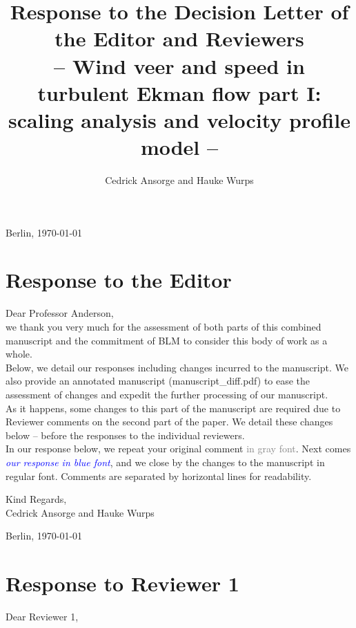 \documentclass[a4paper,10pt]{article}
\title{Response to the Decision Letter of the Editor and Reviewers\\
\normalsize -- Wind veer and speed in turbulent Ekman flow part I: scaling analysis and velocity profile model -- }
\author{Cedrick Ansorge and Hauke Wurps }
\newcommand{\explainformat}{\noindent In our response below, we repeat your original comment \textcolor{gray}{in gray font}. Next comes \textcolor{blue}{\textit{our response in blue font}}, and we close by the changes to the manuscript in regular font. Comments are separated by horizontal lines for readability.\\[1em]}
\begin{document}
\maketitle

\begin{flushright}{Berlin, \today}\\ \end{flushright}
\section*{Response to the Editor} 
\noindent Dear Professor Anderson, \\[1em]

\noindent we thank you very much for the assessment of both parts of this combined manuscript and the commitment of BLM to consider this body of work as a whole. \\[1em]

\noindent Below, we detail our responses including changes incurred to the manuscript. We also provide an annotated manuscript (manuscript\_diff.pdf) to ease the assessment of changes and expedit the further processing of our manuscript. \\[1em]

\noindent As it happens, some changes to this part of the manuscript are required due to Reviewer comments on the second part of the paper. We detail these changes below -- before the responses to the individual reviewers. \\[1em]

\explainformat{}

\noindent Kind Regards, \\
\noindent Cedrick Ansorge and Hauke Wurps 

\newpage 
\begin{flushright}{Berlin, \today}\\ \end{flushright}
\section{Response to Reviewer 1}

Dear Reviewer 1, \\[1em]
\end{document}
